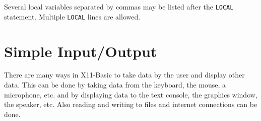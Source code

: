 Several local variables separated by commas may be listed after the
\verb|LOCAL| statement. Multiple \verb|LOCAL| lines are allowed. 


%
%
%
%
%
%



\section{Simple Input/Output}

There are many ways in X11-Basic to take data by the user and display  other
data. This can be done by taking data from the keyboard, the mouse,  a
microphone, etc. and by displaying data to the text console, the  graphics
window, the speaker, etc. Also reading and writing to files and internet
connections can be done. 

